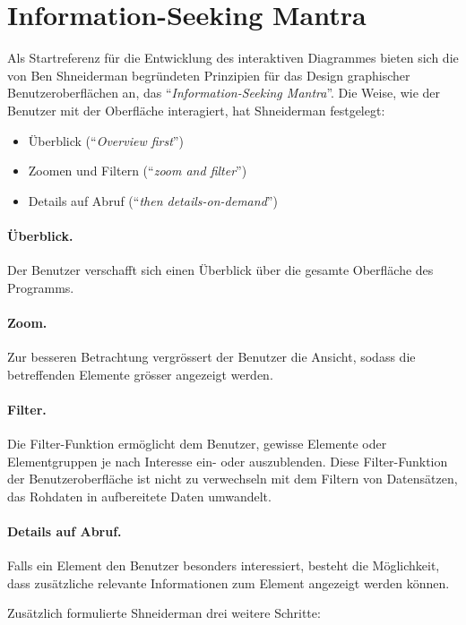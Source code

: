 \section{Information-Seeking Mantra}

Als Startreferenz für die Entwicklung des interaktiven Diagrammes bieten sich die von Ben Shneiderman begründeten Prinzipien für das Design graphischer Benutzeroberflächen an, das "`\textit{Information-Seeking Mantra}"'. Die Weise, wie der Benutzer mit der Oberfläche interagiert, hat Shneiderman \cite{shneiderman} festgelegt:

\begin{itemize}
	\item Überblick ("`\textit{Overview first}"')
	\item Zoomen und Filtern ("`\textit{zoom and filter}"')
	\item Details auf Abruf ("`\textit{then details-on-demand}"')
\end{itemize}

\paragraph{Überblick.} Der Benutzer verschafft sich einen Überblick über die gesamte Oberfläche des Programms.

\paragraph{Zoom.} Zur besseren Betrachtung vergrössert der Benutzer die Ansicht, sodass die betreffenden Elemente grösser angezeigt werden.

\paragraph{Filter.} Die Filter-Funktion ermöglicht dem Benutzer, gewisse Elemente oder Elementgruppen je nach Interesse ein- oder auszublenden. Diese Filter-Funktion der Benutzeroberfläche ist nicht zu verwechseln mit dem Filtern von Datensätzen, das Rohdaten in aufbereitete Daten umwandelt.

\paragraph{Details auf Abruf.} Falls ein Element den Benutzer besonders interessiert, besteht die Möglichkeit, dass zusätzliche relevante Informationen zum Element angezeigt werden können.

Zusätzlich formulierte Shneiderman drei weitere Schritte:

